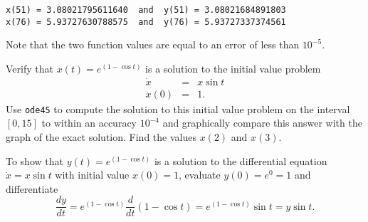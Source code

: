 \documentclass{ximera}
\begin{document}
\begin{exercise}
\begin{solution}
\begin{verbatim}
x(51) = 3.08021795611640  and  y(51) = 3.08021684891803
x(76) = 5.93727630788575  and  y(76) = 5.93727337374561
\end{verbatim}
Note that the two function values are equal to an error of less than 
$10^{-5}$.

\begin{figure}[htb]
     \centerline{%
     }
\end{figure} 


\end{solution}
\end{exercise}

\begin{exercise}  \label{c11.3.2B}
Verify that $x(t) = e^{(1-\cos t)}$ is a solution to the initial value problem
\[
\begin{array}{rcl}
\dot{x} & = & x\sin t \\
x(0) & = & 1.
\end{array}
\]
Use {\tt ode45} to compute the solution to this initial value problem on the
interval $[0,15]$ to within an accuracy $10^{-4}$ and graphically compare 
this answer with the graph of the exact solution.  Find the values $x(2)$ 
and $x(3)$. 

\begin{solution}

To show that $y(t)=e^{(1-\cos t)}$ is a solution to the differential equation
$\dot{x}=x\sin t$ with initial value $x(0)=1$, evaluate $y(0)=e^0=1$ and
differentiate
\[
\frac{dy}{dt} = e^{(1-\cos t)}\frac{d}{dt}(1-\cos t) = 
e^{(1-\cos t)}\sin t = y\sin t.
\]


\end{solution}
\end{exercise}
\end{document}
